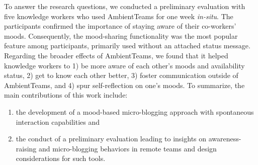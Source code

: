 


\bigskip\noindent To answer the research questions, we conducted a preliminary evaluation with five knowledge workers who used AmbientTeams for one week \textit{in-situ}. The participants confirmed the importance of staying aware of their co-workers' moods. Consequently, the mood-sharing functionality was the most popular feature among participants, primarily used without an attached status message. Regarding the broader effects of AmbientTeams, we found that it helped knowledge workers to 1) be more aware of each other's moods and availability status, 2) get to know each other better, 3) foster communication outside of AmbientTeams, and 4) spur self-reflection on one's moods. To summarize, the main contributions of this work include:

\begin{enumerate}
    \item the development of a mood-based micro-blogging approach with spontaneous interaction capabilities and
    \item the conduct of a preliminary evaluation leading to insights on awareness-raising and micro-blogging behaviors in remote teams and design considerations for such tools.
\end{enumerate}

